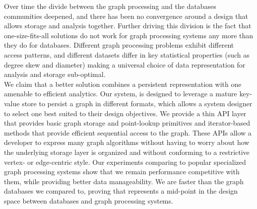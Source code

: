 Over time the divide between the graph processing and the databases communities deepened, and there has been no convergence around a design that allows storage and analysis together.
Further driving this division is the fact that one-size-fits-all solutions do not work for graph processing systems any more than they do for databases.
Different graph processing problems exhibit different access patterns, and different datasets differ in key statistical properties (such as degree skew and diameter) making a universal choice of data representation for analysis and storage sub-optimal.
\\
We claim that a better solution combines a persistent representation with one amenable to efficient analytics.
Our system, \project{} is designed to leverage a mature key-value store to persist a graph in different formats, which allows a system designer to select one best suited to their design objectives.
We provide a thin API layer that provides basic graph storage and point-lookup primitives and iterator-based methods that provide efficient sequential access to the graph.
These APIs allow a developer to express many graph algorithms without having to worry about how the underlying storage layer is organized and without conforming to a restrictive vertex- or edge-centric style.
Our experiments comparing \project{} to popular specialized graph processing systems show that we remain performance competitive with them, while providing better data manageability.
We are faster than the graph databases we compared to, proving that \project{} represents a mid-point in the design space between databases and graph processing systems.